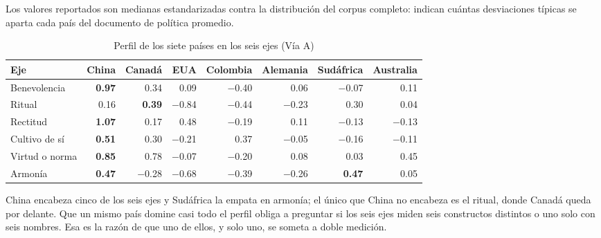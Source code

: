 \documentclass[12pt,letterpaper]{article}
\begin{document}
Los valores reportados son medianas estandarizadas contra la distribución del corpus completo: indican cuántas desviaciones típicas se aparta cada país del documento de política promedio.

\begin{table}[htbp]
\centering
\small
\caption{Perfil de los siete países en los seis ejes (Vía A)}
\begin{tabular}{@{}lrrrrrrr@{}}
\toprule
\textbf{Eje} & \textbf{China} & \textbf{Canadá} & \textbf{EUA} & \textbf{Colombia} & \textbf{Alemania} & \textbf{Sudáfrica} & \textbf{Australia} \\
\midrule
Benevolencia  & \textbf{0.97} & 0.34 & 0.09 & $-$0.40 & 0.06 & $-$0.07 & 0.11 \\
Ritual        & 0.16 & \textbf{0.39} & $-$0.84 & $-$0.44 & $-$0.23 & 0.30 & 0.04 \\
Rectitud      & \textbf{1.07} & 0.17 & 0.48 & $-$0.19 & 0.11 & $-$0.13 & $-$0.13 \\
Cultivo de sí & \textbf{0.51} & 0.30 & $-$0.21 & 0.37 & $-$0.05 & $-$0.16 & $-$0.11 \\
Virtud o norma & \textbf{0.85} & 0.78 & $-$0.07 & $-$0.20 & 0.08 & 0.03 & 0.45 \\
Armonía       & \textbf{0.47} & $-$0.28 & $-$0.68 & $-$0.39 & $-$0.26 & \textbf{0.47} & 0.05 \\
\bottomrule
\end{tabular}
\end{table}

China encabeza cinco de los seis ejes y Sudáfrica la empata en armonía; el único que China no encabeza es el ritual, donde Canadá queda por delante. Que un mismo país domine casi todo el perfil obliga a preguntar si los seis ejes miden seis constructos distintos o uno solo con seis nombres. Esa es la razón de que uno de ellos, y solo uno, se someta a doble medición.
\end{document}
